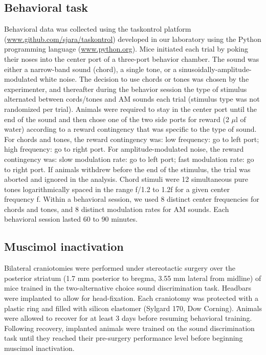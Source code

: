\subsection{Behavioral task}
Behavioral data was collected using the taskontrol platform
(\url{www.github.com/sjara/taskontrol}) developed in our laboratory using the
Python programming language (\url{www.python.org}).
%
Mice initiated each trial by poking their noses into the center port of a
three-port behavior chamber.
%
%
The sound was either a narrow-band sound (chord), a single tone, or a
sinusoidally-amplitude-modulated white noise.
%
The decision to use chords or tones was chosen by the experimenter, and
thereafter during the behavior session the type of stimulus alternated between
cords/tones and AM sounds each trial (stimulus type was not randomized per
trial).
%
Animals were required to stay in the center port until the end of the sound and
then chose one of the two side ports for reward (2 $\mu$l of water) according
to a reward contingency that was specific to the type of sound.
%
For chords and tones, the reward contingency was: low frequency: go to left
port; high frequency: go to right port.
%
For amplitude-modulated noise, the reward contingency was: slow modulation
rate: go to left port; fast modulation rate: go to right port.
%
If animals withdrew before the end of the stimulus, the trial was aborted and
ignored in the analysis.
%
Chord stimuli were 12 simultaneous pure tones logarithmically spaced in the
range f/1.2 to 1.2f for a given center frequency f.
%
Within a behavioral session, we used 8 distinct center frequencies for chords
and tones, and 8 distinct modulation rates for AM sounds.
%
Each behavioral session lasted 60 to 90 minutes.

\subsection{Muscimol inactivation}
Bilateral craniotomies were performed under stereotactic surgery over the
posterior striatum (1.7 mm posterior to bregma, 3.55 mm lateral from midline)
of mice trained in the two-alternative choice sound discrimination task.
%
Headbars were implanted to allow for head-fixation.
%
Each craniotomy was protected with a plastic ring and filled with silicon elastomer (Sylgard 170, Dow Corning).
%
Animals were allowed to recover for at least 3 days before resuming behavioral training.
%
Following recovery, implanted animals were trained on the sound discrimination task until they reached their pre-surgery performance level before beginning muscimol inactivation.

